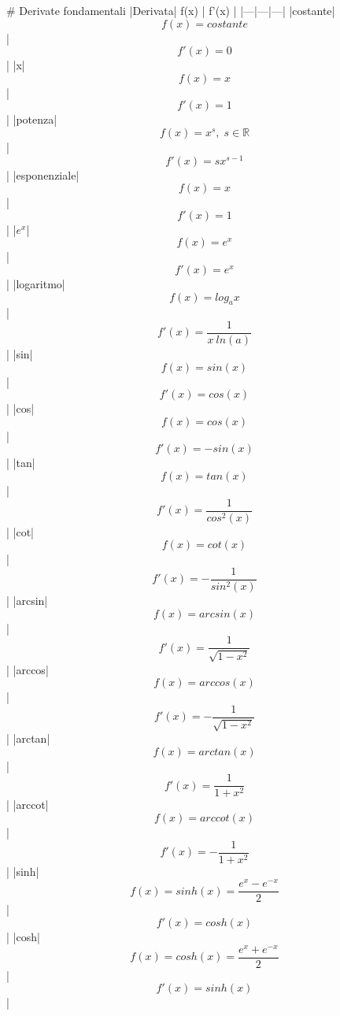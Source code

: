 # Derivate fondamentali
 |Derivata| f(x) | f'(x) |
|---|---|---|
|costante|$$f(x) = costante$$  | $$f'(x)=0$$ |
|x|$$f(x) = x$$  | $$f'(x)=1$$ |
|potenza|$$f(x) = x^s, \; s \in \mathbb{R}$$ | $$f'(x)=sx^{s-1}$$ |
|esponenziale|$$f(x) = x$$  | $$f'(x)=1$$ |
|$e^x$|$$f(x) = e^x$$  | $$f'(x)=e^x$$ |
|logaritmo|$$f(x) = log_a{x}$$  | $$f'(x)= \frac{1}{x \ ln(a)}$$ |
|sin|$$f(x) = sin(x)$$  | $$f'(x)=cos(x)$$ |
|cos|$$f(x) = cos(x)$$  | $$f'(x)=-sin(x)$$ |
|tan|$$f(x) = tan(x)$$  | $$f'(x)= \frac{1}{cos^2(x)}$$ |
|cot|$$f(x) = cot(x)$$  | $$f'(x)= - \frac{1}{sin^2(x)}$$ |
|arcsin|$$f(x) = arcsin(x)$$  | $$f'(x)= \frac{1}{ \sqrt{1-x^2}}$$ |
|arccos|$$f(x) = arccos(x)$$  | $$f'(x)= - \frac{1}{ \sqrt{1-x^2}}$$ |
|arctan|$$f(x) = arctan(x)$$  | $$f'(x)= \frac{1}{1+x^2}$$ |
|arccot|$$f(x) = arccot(x)$$  | $$f'(x)= - \frac{1}{1+x^2}$$ |
|sinh|$$f(x) = sinh(x) = \frac{e^x-e^{-x}}{2}$$  | $$f'(x)= cosh(x)$$ |
|cosh|$$f(x) = cosh(x) = \frac{e^x+e^{-x}}{2}$$  | $$f'(x)= sinh(x)$$ |

















